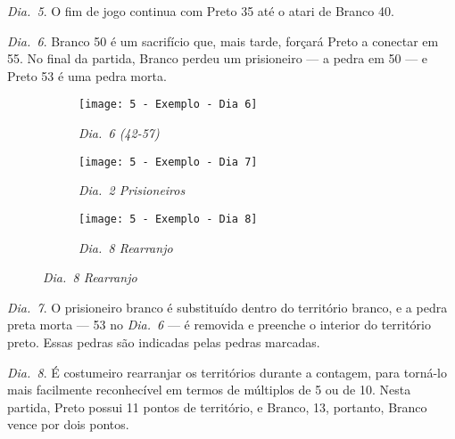 \emph{Dia.\@~5}. O fim de jogo continua com Preto 35 até o atari de Branco 40.

\emph{Dia.\@~6}. Branco 50 é um sacrifício que, mais tarde, forçará Preto a conectar em 55. No final da partida, Branco perdeu um prisioneiro --- a pedra em 50 --- e Preto 53 é uma pedra morta.

\begin{figure}[h!]
  \centering
  \begin{subfigure}[t]{.3\textwidth}
    \centering
    \texttt{[image: 5 - Exemplo - Dia 6]}
    \captionsetup{justification=centering}
    \caption*{\emph{Dia.\@~6 (42-57)}}
  \end{subfigure}
  \hfill
  \begin{subfigure}[t]{.3\textwidth}
    \centering
    \texttt{[image: 5 - Exemplo - Dia 7]}
    \captionsetup{justification=centering}
    \caption*{\emph{Dia.\@~2 Prisioneiros}}
  \end{subfigure}
  \hfill
  \begin{subfigure}[t]{.3\textwidth}
    \centering
    \texttt{[image: 5 - Exemplo - Dia 8]}
    \captionsetup{justification=centering}
    \caption*{\emph{Dia.\@~8 Rearranjo}}
  \end{subfigure}
\end{figure}

\emph{Dia.\@~7}. O prisioneiro branco é substituído dentro do território branco, e a pedra preta morta --- 53 no \emph{Dia.\@~6} --- é removida e preenche o interior do território preto. Essas pedras são indicadas pelas pedras marcadas.

\emph{Dia.\@~8}. É costumeiro rearranjar os territórios durante a contagem, para torná-lo mais facilmente reconhecível em termos de múltiplos de 5 ou de 10. Nesta partida, Preto possui 11 pontos de território, e Branco, 13, portanto, Branco vence por dois pontos.